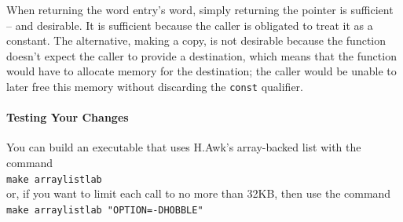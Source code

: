 \begin{description}
\end{description}

When returning the word entry's word, simply returning the pointer is sufficient -- and desirable.
It is sufficient because the caller is obligated to treat it as a constant.
The alternative, making a copy, is not desirable because the function doesn't expect the caller to provide a destination, which means that the function would have to allocate memory for the destination;
the caller would be unable to later free this memory without discarding the \lstinline{const} qualifier.

\paragraph{Testing Your Changes}

You can build an executable that uses H.Awk's array-backed list with the command \\
\verb+make arraylistlab+ \\
or, if you want to limit each  call to no more than 32KB, then use the command \\
\verb+make arraylistlab "OPTION=-DHOBBLE"+

